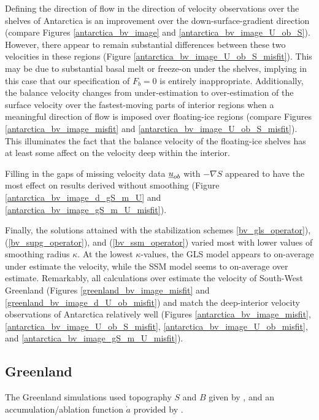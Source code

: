 Defining the direction of flow in the direction of velocity observations over the shelves of Antarctica is an improvement over the down-surface-gradient direction (compare Figures \ref{antarctica_bv_image} and \ref{antarctica_bv_image_U_ob_S}).  However, there appear to remain substantial differences between these two velocities in these regions (Figure \ref{antarctica_bv_image_U_ob_S_misfit}).  This may be due to substantial basal melt or freeze-on under the shelves, implying in this case that our specification of $F_b = 0$ is entirely inappropriate.  Additionally, the balance velocity changes from under-estimation to over-estimation of the surface velocity over the fastest-moving parts of interior regions when a meaningful direction of flow is imposed over floating-ice regions (compare Figures \ref{antarctica_bv_image_misfit} and \ref{antarctica_bv_image_U_ob_S_misfit}).  This illuminates the fact that the balance velocity of the floating-ice shelves has at least some affect on the velocity deep within the interior.

Filling in the gaps of missing velocity data $\underline{u}_{ob}$ with $-\nabla S$ appeared to have the most effect on results derived without smoothing (Figure \ref{antarctica_bv_image_d_gS_m_U} and \ref{antarctica_bv_image_gS_m_U_misfit}).

Finally, the solutions attained with the stabilization schemes \ref{bv_gls_operator}), (\ref{bv_supg_operator}), and (\ref{bv_ssm_operator}) varied most with lower values of smoothing radius $\kappa$.  At the lowest $\kappa$-values, the GLS model appears to on-average under estimate the velocity, while the SSM model seems to on-average over estimate.  Remarkably, all calculations over estimate the velocity of South-West Greenland (Figures \ref{greenland_bv_image_misfit} and \ref{greenland_bv_image_d_U_ob_misfit}) and match the deep-interior velocity observations of Antarctica relatively well (Figures \ref{antarctica_bv_image_misfit}, \ref{antarctica_bv_image_U_ob_S_misfit}, \ref{antarctica_bv_image_U_ob_misfit}, and \ref{antarctica_bv_image_gS_m_U_misfit}). 

\subsection{Greenland}

The Greenland simulations used topography $S$ and $B$ given by \citet{bamber_2013}, and an accumulation/ablation function $\dot{a}$ provided by \citet{annoortvanvanderveen_2001,burgess_2010}.

